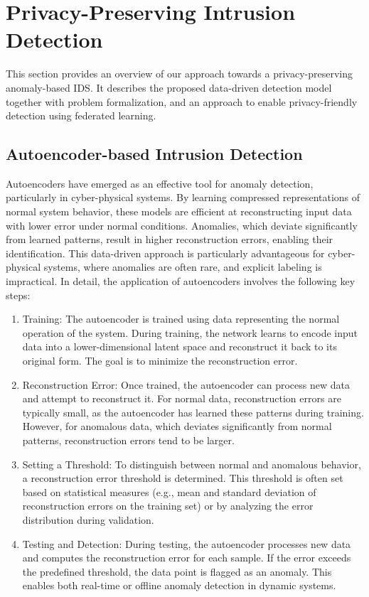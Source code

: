 \section{Privacy-Preserving Intrusion Detection} 
\label{section:approach}

This section provides an overview of our approach towards a privacy-preserving anomaly-based IDS. It describes the proposed data-driven detection model together with problem formalization, and an approach to enable privacy-friendly detection using federated learning.

\subsection{Autoencoder-based Intrusion Detection}

Autoencoders have emerged as an effective tool for anomaly detection, particularly in cyber-physical systems. By learning compressed representations of normal system behavior, these models are efficient at reconstructing input data with lower error under normal conditions. Anomalies, which deviate significantly from learned patterns, result in higher reconstruction errors, enabling their identification. This data-driven approach is particularly advantageous for cyber-physical systems, where anomalies are often rare, and explicit labeling is impractical. In detail, the application of autoencoders involves the following key steps:

\begin{enumerate}
    \item Training: The autoencoder is trained using data representing the normal operation of the system. During training, the network learns to encode input data into a lower-dimensional latent space and reconstruct it back to its original form. The goal is to minimize the reconstruction error.
    \item Reconstruction Error: Once trained, the autoencoder can process new data and attempt to reconstruct it. For normal data, reconstruction errors are typically small, as the autoencoder has learned these patterns during training. However, for anomalous data, which deviates significantly from normal patterns, reconstruction errors tend to be larger.
    \item Setting a Threshold: To distinguish between normal and anomalous behavior, a reconstruction error threshold is determined. This threshold is often set based on statistical measures (e.g., mean and standard deviation of reconstruction errors on the training set) or by analyzing the error distribution during validation.
    \item  Testing and Detection: During testing, the autoencoder processes new data and computes the reconstruction error for each sample. If the error exceeds the predefined threshold, the data point is flagged as an anomaly. This enables both real-time or offline anomaly detection in dynamic systems.
\end{enumerate}
    

